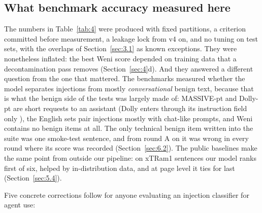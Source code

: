 \documentclass[11pt]{article}
\begin{document}
\subsection{What benchmark accuracy measured here}\label{sec:9.1}

The numbers in Table~\ref{tab:4} were produced with fixed partitions, a criterion committed before measurement, a leakage lock from v4 on, and no tuning on test sets, with the overlaps of Section~\ref{sec:3.1} as known exceptions. They were nonetheless inflated: the best Weni score depended on training data that a decontamination pass removes (Section~\ref{sec:4}d). And they answered a different question from the one that mattered. The benchmarks measured whether the model separates injections from mostly \emph{conversational} benign text, because that is what the benign side of the tests was largely made of: MASSIVE-pt and Dolly-pt are short requests to an assistant (Dolly enters through its instruction field only%
), the English sets pair injections mostly with chat-like prompts, and Weni contains no benign items at all. The only technical benign item written into the suite was one smoke-test sentence, and from round A on it was wrong in every round where its score was recorded (Section~\ref{sec:6.2}). The public baselines make the same point from outside our pipeline: on xTRam1 sentences our model ranks first of six, helped by in-distribution data, and at page level it ties for last (Section~\ref{sec:5.4}).

Five concrete corrections follow for anyone evaluating an injection classifier for agent use:
\end{document}
